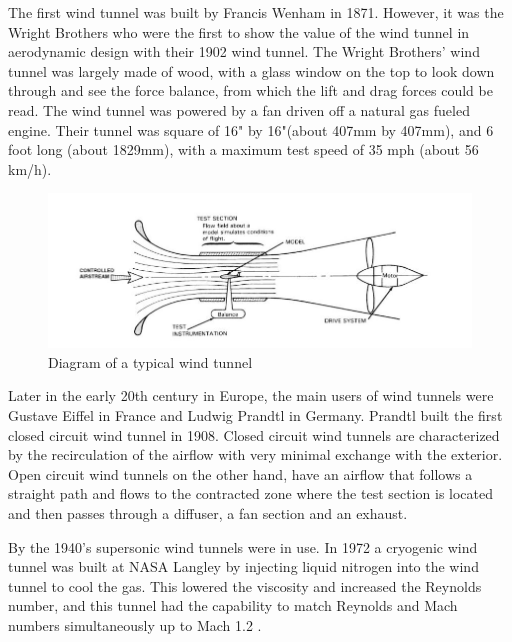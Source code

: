 The first wind tunnel was built by Francis Wenham in 1871. However, it was the Wright Brothers who were the first to show the value of the wind tunnel in aerodynamic design with their 1902 wind tunnel.  The Wright Brothers’ wind tunnel was largely made of wood, with a glass window on the top to look down through and see the force balance, from which the
lift and drag forces could be read. The wind tunnel was powered by a fan driven off a natural gas fueled engine. Their tunnel was square of 16" by 16"(about 407mm by 407mm), and 6 foot long (about 1829mm), with a maximum test speed of 35 mph (about 56 km/h).
\begin{center}
	\begin{figure}[!h]
	\centering
	\includegraphics[width=0.75\linewidth]{Figures/Fig2}
	\caption[A Typical Wind Tunnel]{Diagram of a typical wind tunnel \cite{morris_force_2010}}
	\end{figure}
\end{center}

Later in the early 20th century in Europe, the main users of wind tunnels were Gustave Eiffel in France and Ludwig Prandtl in Germany. Prandtl built the first closed circuit wind tunnel in 1908. Closed circuit wind tunnels are characterized by the recirculation of the airflow with very minimal exchange with the exterior. Open circuit wind tunnels on the other hand, have an airflow that follows a straight path and flows to the contracted zone where the test section is located and then passes through a diffuser, a fan section and an exhaust.

By the 1940’s supersonic wind tunnels were in use. In 1972 a cryogenic wind tunnel was built at NASA Langley by injecting liquid nitrogen into the wind tunnel to cool the gas. This lowered the viscosity and increased the Reynolds number, and this tunnel had the capability to match Reynolds and Mach numbers simultaneously up to Mach 1.2
\cite{fernandes_design_nodate}.

